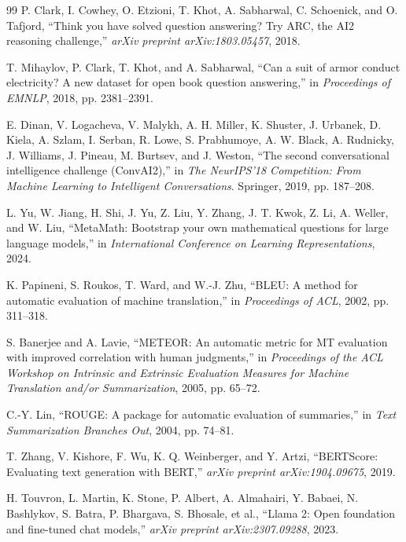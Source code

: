 \documentclass[UTF8,a4paper,11pt]{ctexart}
\begin{document}
\begin{thebibliography}{99}
P. Clark, I. Cowhey, O. Etzioni, T. Khot, A. Sabharwal, C. Schoenick, and O. Tafjord, ``Think you have solved question answering? Try ARC, the AI2 reasoning challenge,'' \emph{arXiv preprint arXiv:1803.05457}, 2018.

T. Mihaylov, P. Clark, T. Khot, and A. Sabharwal, ``Can a suit of armor conduct electricity? A new dataset for open book question answering,'' in \emph{Proceedings of EMNLP}, 2018, pp. 2381--2391.

E. Dinan, V. Logacheva, V. Malykh, A. H. Miller, K. Shuster, J. Urbanek, D. Kiela, A. Szlam, I. Serban, R. Lowe, S. Prabhumoye, A. W. Black, A. Rudnicky, J. Williams, J. Pineau, M. Burtsev, and J. Weston, ``The second conversational intelligence challenge (ConvAI2),'' in \emph{The NeurIPS'18 Competition: From Machine Learning to Intelligent Conversations}. Springer, 2019, pp. 187--208.

L. Yu, W. Jiang, H. Shi, J. Yu, Z. Liu, Y. Zhang, J. T. Kwok, Z. Li, A. Weller, and W. Liu, ``MetaMath: Bootstrap your own mathematical questions for large language models,'' in \emph{International Conference on Learning Representations}, 2024.

K. Papineni, S. Roukos, T. Ward, and W.-J. Zhu, ``BLEU: A method for automatic evaluation of machine translation,'' in \emph{Proceedings of ACL}, 2002, pp. 311--318.

S. Banerjee and A. Lavie, ``METEOR: An automatic metric for MT evaluation with improved correlation with human judgments,'' in \emph{Proceedings of the ACL Workshop on Intrinsic and Extrinsic Evaluation Measures for Machine Translation and/or Summarization}, 2005, pp. 65--72.

C.-Y. Lin, ``ROUGE: A package for automatic evaluation of summaries,'' in \emph{Text Summarization Branches Out}, 2004, pp. 74--81.

T. Zhang, V. Kishore, F. Wu, K. Q. Weinberger, and Y. Artzi, ``BERTScore: Evaluating text generation with BERT,'' \emph{arXiv preprint arXiv:1904.09675}, 2019.

H. Touvron, L. Martin, K. Stone, P. Albert, A. Almahairi, Y. Babaei, N. Bashlykov, S. Batra, P. Bhargava, S. Bhosale, et al., ``Llama 2: Open foundation and fine-tuned chat models,'' \emph{arXiv preprint arXiv:2307.09288}, 2023.


\end{thebibliography}
\end{document}
